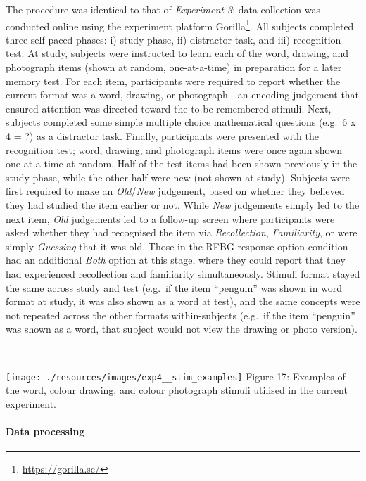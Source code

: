 \documentclass[
  11pt,
]{article}
\begin{document}
\hfill\break The procedure was identical to that of \emph{Experiment 3};
data collection was conducted online using the experiment platform
Gorilla\footnote{\url{https://gorilla.sc/}}. All subjects completed
three self-paced phases: i) study phase, ii) distractor task, and iii)
recognition test. At study, subjects were instructed to learn each of
the word, drawing, and photograph items (shown at random, one-at-a-time)
in preparation for a later memory test. For each item, participants were
required to report whether the current format was a word, drawing, or
photograph - an encoding judgement that ensured attention was directed
toward the to-be-remembered stimuli. Next, subjects completed some
simple multiple choice mathematical questions (e.g.~6 x 4 = ?) as a
distractor task. Finally, participants were presented with the
recognition test; word, drawing, and photograph items were once again
shown one-at-a-time at random. Half of the test items had been shown
previously in the study phase, while the other half were new (not shown
at study). Subjects were first required to make an \emph{Old}/\emph{New}
judgement, based on whether they believed they had studied the item
earlier or not. While \emph{New} judgements simply led to the next item,
\emph{Old} judgements led to a follow-up screen where participants were
asked whether they had recognised the item via \emph{Recollection},
\emph{Familiarity}, or were simply \emph{Guessing} that it was old.
Those in the RFBG response option condition had an additional
\emph{Both} option at this stage, where they could report that they had
experienced recollection and familiarity simultaneously. Stimuli format
stayed the same across study and test (e.g.~if the item ``penguin'' was
shown in word format at study, it was also shown as a word at test), and
the same concepts were not repeated across the other formats
within-subjects (e.g.~if the item ``penguin'' was shown as a word, that
subject would not view the drawing or photo version).

~ ~

\texttt{[image: ./resources/images/exp4\_\_stim\_examples]}
Figure 17: Examples of the word, colour drawing, and colour photograph
stimuli utilised in the current experiment. ~ ~

\hypertarget{data-processing-3}{%
\paragraph{Data processing}\label{data-processing-3}}
\end{document}
